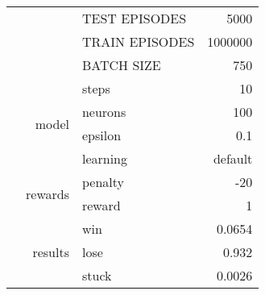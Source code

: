 \documentclass[9pt]{article}
\begin{document}
\begin{tabularx}{\textwidth}{l|r|X|r}
	& & TEST EPISODES & 5000 \\
	& & TRAIN EPISODES & 1000000 \\
	& & BATCH SIZE & 750 \\
	& & steps & 10\\\cline{2-4}
	& \multirow{2}{*}{model} & neurons & 100 \\ 
	& & epsilon & 0.1\\
	& & learning & default \\\cline{2-4}
	& \multirow{2}{*}{rewards} & penalty & -20\\
	& & reward& 1\\\cline{2-4}
	& \multirow{3}{*}{results} & win & 0.0654 \\
	& & lose & 0.932 \\
	& & stuck & 0.0026 \\
	\hline
\end{tabularx}
\end{document}
